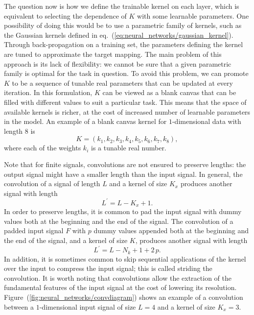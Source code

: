 The question now is how we define the trainable kernel on each layer, which is equivalent to
selecting the dependence of $K$ with some learnable parameters. One possibility of doing this would
be to use a parametric family of kernels, such as the Gaussian kernels defined in
eq.~(\ref{eq:neural_networks/gaussian_kernel}). Through back-propagation on a training set, the
parameters defining the kernel are tuned to approximate the target mapping. The main problem of this
approach is its lack of flexibility: we cannot be sure that a given parametric family is optimal for
the task in question. To avoid this problem, we can promote $K$ to be a sequence of tunable real
parameters that can be updated at every iteration. In this formulation, $K$ can be viewed as a blank
canvas that can be filled with different values to suit a particular task. This means that the space
of available kernels is richer, at the cost of increased number of learnable parameters in the
model. An example of a blank canvas kernel for $1$-dimensional data with length $8$ is
\begin{equation}
    K = (k_1, k_2, k_3, k_4, k_5, k_6, k_7, k_8), 
\end{equation}
where each of the weights $k_i$ is a tunable real number.
 
Note that for finite signals, convolutions are not ensured to preserve lengths: the output signal
might have a smaller length than the input signal. In general, the convolution of a signal of length
$L$ and a kernel of size $K_x$ produces another signal with length 
\begin{equation}
    L^\prime = L - K_x + 1.
\end{equation}
In order to preserve lengths, it is common to pad the input signal with dummy values both at the
beginning and the end of the signal. The convolution of a padded input signal $F$ with $p$ dummy
values appended both at the beginning and the end of the signal, and a kernel of size $K$, produces
another signal with length
\begin{equation}
    L^\prime = L - N_k + 1 + 2\, p.
    \label{eq:neural_networks/length_shrink}
\end{equation}
In addition, it is sometimes common to skip sequential applications of the kernel over the input to
compress the input signal; this is called striding the convolution. It is worth noting that
convolutions allow the extraction of the fundamental features of the input signal at the cost of
lowering its resolution. Figure~(\ref{fig:neural_networks/convdiagram}) shows an example of a
convolution between a $1$-dimensional input signal of size $L = 4$ and a kernel of size $K_x = 3$.

